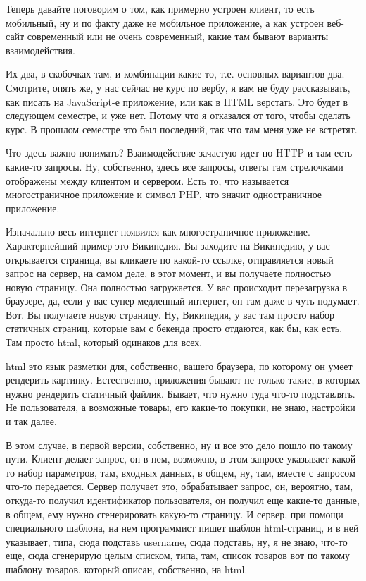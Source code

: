 \documentclass[12pt]{article} %
\begin{document}
Теперь давайте поговорим о том, как примерно устроен клиент, то есть мобильный, ну и по факту даже не мобильное приложение, а как устроен веб-сайт современный или не очень современный, какие там бывают варианты взаимодействия.  

Их два, в скобочках там, и комбинации какие-то, т.е. основных вариантов два.  Смотрите, опять же, у нас сейчас не курс по вербу, я вам не буду рассказывать, как писать на JavaScript-е приложение, или как в HTML верстать. Это будет в следующем семестре, и уже нет.  Потому что я отказался от того, чтобы сделать курс. В прошлом семестре это был последний, так что там меня уже не встретят.  

Что здесь важно понимать?  Взаимодействие зачастую идет по HTTP и там есть какие-то запросы.  Ну, собственно, здесь все запросы, ответы там стрелочками отображены между клиентом и сервером.  Есть то, что называется многостраничное приложение и символ PHP, что значит одностраничное приложение.  

Изначально весь интернет появился как многостраничное приложение.  Характернейший пример это Википедия. Вы заходите на Википедию, у вас открывается страница, вы кликаете по какой-то ссылке, отправляется новый запрос на сервер, на самом деле, в этот момент, и вы получаете полностью новую страницу. Она полностью загружается. У вас происходит перезагрузка в браузере, да, если у вас супер медленный интернет, он там даже в чуть подумает. Вот. Вы получаете новую страницу. Ну, Википедия, у вас там просто набор статичных страниц, которые вам с бекенда просто отдаются, как бы, как есть.  Там просто html, который одинаков для всех.

html это язык разметки для, собственно, вашего браузера, по которому он умеет рендерить картинку.  Естественно, приложения бывают не только такие, в которых нужно рендерить статичный файлик.  Бывает, что нужно туда что-то подставлять.  Не пользователя, а возможные товары, его какие-то покупки, не знаю, настройки и так далее.  

В этом случае, в первой версии, собственно, ну и все это дело пошло по такому пути.  Клиент делает запрос, он в нем, возможно, в этом запросе указывает какой-то набор параметров, там, входных данных, в общем, ну, там, вместе с запросом что-то передается.  Сервер получает это, обрабатывает запрос, он, вероятно, там, откуда-то получил идентификатор пользователя, он получил еще какие-то данные, в общем, ему нужно сгенерировать какую-то страницу.  И сервер, при помощи специального шаблона, на нем программист пишет шаблон html-страниц, и в ней указывает, типа, сюда подставь username, сюда подставь, ну, я не знаю, что-то еще, сюда сгенерирую целым списком, типа, там, список товаров вот по такому шаблону товаров, который описан, собственно, на html.  
\end{document}
